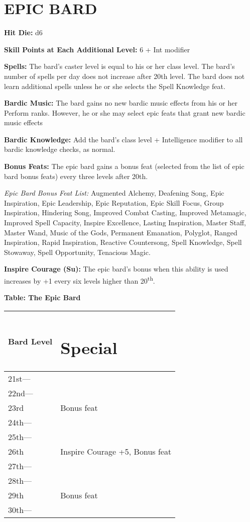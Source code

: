 \documentclass{article}
\begin{document}
\vspace{12pt}
\section*{{\LARGE{}EPIC BARD}}

\textbf{Hit Die:} d6

\textbf{Skill Points at Each Additional Level:} 6 + Int modifier

\textbf{Spells:} The bard's caster level is equal to his or her class level. The 
bard's number of spells per day does not increase after 20th level. The bard does 
not learn additional spells unless he or she selects the Spell Knowledge feat.

\textbf{Bardic Music:} The bard gains no new bardic music effects from his or her 
Perform ranks. However, he or she may select epic feats that grant new bardic music 
effects

\textbf{Bardic Knowledge:} Add the bard's class level + Intelligence modifier to 
all bardic knowledge checks, as normal. 

\textbf{Bonus Feats:} The epic bard gains a bonus feat (selected from the list 
of epic bard bonus feats) every three levels after 20th. 

\textit{Epic Bard Bonus Feat List: }Augmented Alchemy, Deafening Song, Epic Inspiration, 
Epic Leadership, Epic Reputation, Epic Skill Focus, Group Inspiration, Hindering 
Song, Improved Combat Casting, Improved Metamagic, Improved Spell Capacity, Inspire 
Excellence, Lasting Inspiration, Master Staff, Master Wand, Music of the Gods, 
Permanent Emanation, Polyglot, Ranged Inspiration, Rapid Inspiration, Reactive 
Countersong, Spell Knowledge, Spell Stowaway, Spell Opportunity, Tenacious Magic. 

\textbf{Inspire Courage (Su):} The epic bard's bonus when this ability is used 
increases by +1 every six levels higher than 20\textsuperscript{th}.

\vspace{12pt}
\textbf{Table: The Epic Bard }

\begin{tabular}{|>{\raggedright}p{29pt}|>{\raggedright}p{158pt}|}
\hline
B\textbf{ard Level} & \section*{S\textbf{pecial }}\tabularnewline
\hline
21st--- &  \tabularnewline
\hline
22nd--- &  \tabularnewline
\hline
23rd & Bonus feat \tabularnewline
\hline
24th--- &  \tabularnewline
\hline
25th--- &  \tabularnewline
\hline
26th & Inspire Courage +5, Bonus feat \tabularnewline
\hline
27th--- &  \tabularnewline
\hline
28th--- &  \tabularnewline
\hline
29th & Bonus feat \tabularnewline
\hline
30th--- &  \tabularnewline
\hline
\end{tabular}
\end{document}
